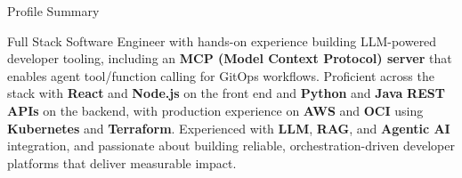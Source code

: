 \documentclass{resume}
\begin{document}
\begin{rSection}{Profile Summary}

Full Stack Software Engineer with hands-on experience building LLM-powered developer tooling, including an \textbf{MCP (Model Context Protocol) server} that enables agent tool/function calling for GitOps workflows. Proficient across the stack with \textbf{React} and \textbf{Node.js} on the front end and \textbf{Python} and \textbf{Java} \textbf{REST APIs} on the backend, with production experience on \textbf{AWS} and \textbf{OCI} using \textbf{Kubernetes} and \textbf{Terraform}. Experienced with \textbf{LLM}, \textbf{RAG}, and \textbf{Agentic AI} integration, and passionate about building reliable, orchestration-driven developer platforms that deliver measurable impact.

\end{rSection}
\end{document}
